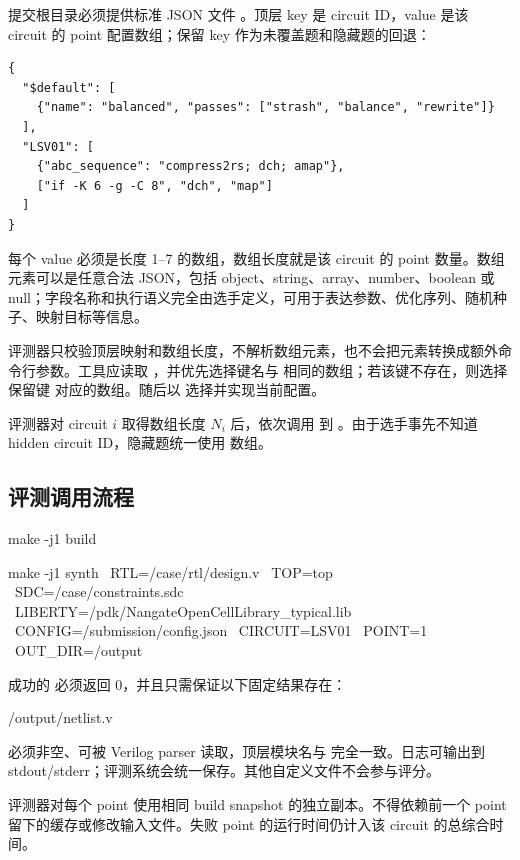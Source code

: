 \documentclass[UTF8,a4paper,11pt,fontset=fandol]{ctexart}
\begin{document}
提交根目录必须提供标准 JSON 文件 。顶层 key 是 circuit ID，value 是该 circuit 的 point 配置数组；保留 key  作为未覆盖题和隐藏题的回退：

\begin{lstlisting}[style=contestcode,frame=single,backgroundcolor=\color{CodeBg},rulecolor=\color{TableBorder}]
{
  "$default": [
    {"name": "balanced", "passes": ["strash", "balance", "rewrite"]}
  ],
  "LSV01": [
    {"abc_sequence": "compress2rs; dch; amap"},
    ["if -K 6 -g -C 8", "dch", "map"]
  ]
}
\end{lstlisting}

每个 value 必须是长度 1--7 的数组，数组长度就是该 circuit 的 point 数量。数组元素可以是任意合法 JSON，包括 object、string、array、number、boolean 或 null；字段名称和执行语义完全由选手定义，可用于表达参数、优化序列、随机种子、映射目标等信息。

评测器只校验顶层映射和数组长度，不解析数组元素，也不会把元素转换成额外命令行参数。工具应读取 ，并优先选择键名与  相同的数组；若该键不存在，则选择保留键  对应的数组。随后以  选择并实现当前配置。

评测器对 circuit \(i\) 取得数组长度 \(N_i\) 后，依次调用  到 。由于选手事先不知道 hidden circuit ID，隐藏题统一使用  数组。

\subsection{评测调用流程}

\begin{codebox}
make -j1 build

make -j1 synth \
  RTL=/case/rtl/design.v \
  TOP=top \
  SDC=/case/constraints.sdc \
  LIBERTY=/pdk/NangateOpenCellLibrary_typical.lib \
  CONFIG=/submission/config.json \
  CIRCUIT=LSV01 \
  POINT=1 \
  OUT_DIR=/output
\end{codebox}

成功的 \code{synth} 必须返回 0，并且只需保证以下固定结果存在：

\begin{codebox}
/output/netlist.v
\end{codebox}

 必须非空、可被 Verilog parser 读取，顶层模块名与  完全一致。日志可输出到 stdout/stderr；评测系统会统一保存。其他自定义文件不会参与评分。

\begin{noticebox}
评测器对每个 point 使用相同 build snapshot 的独立副本。不得依赖前一个 point 留下的缓存或修改输入文件。失败 point 的运行时间仍计入该 circuit 的总综合时间。
\end{noticebox}
\end{document}
